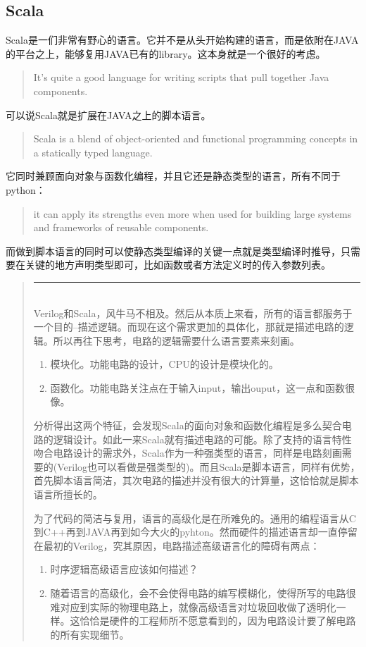 \documentclass[twocolumn,10pt]{article}
\newenvironment{commentary}
{ \vspace{-0.1in}
  \begin{quotation}
  \noindent
  \small \em
  \rule{\linewidth}{1pt}\\
}
{
  \end{quotation}
}
\begin{document}
\subsection{Scala}
Scala是一们非常有野心的语言。它并不是从头开始构建的语言，而是依附在JAVA的平台之上，能够复用JAVA已有的library。这本身就是一个很好的考虑。
\begin{quote}
	It’s quite a good language for writing scripts that pull together Java components.
\end{quote} 
可以说Scala就是扩展在JAVA之上的脚本语言。
\begin{quote}
	Scala is a blend of object-oriented and functional programming concepts in a statically typed language.
\end{quote}
它同时兼顾面向对象与函数化编程，并且它还是静态类型的语言，所有不同于python：
\begin{quote}
	it can apply its strengths even more when used for building large systems and frameworks of reusable components.
\end{quote}
而做到脚本语言的同时可以使静态类型编译的关键一点就是类型编译时推导，只需要在关键的地方声明类型即可，比如函数或者方法定义时的传入参数列表。
\begin{commentary}
	Verilog和Scala，风牛马不相及。然后从本质上来看，所有的语言都服务于一个目的--描述逻辑。而现在这个需求更加的具体化，那就是描述电路的逻辑。所以再往下思考，电路的逻辑需要什么语言要素来刻画。
	\begin{enumerate}
		\item 模块化。功能电路的设计，CPU的设计是模块化的。
		\item 函数化。功能电路关注点在于输入input，输出ouput，这一点和函数很像。
	\end{enumerate}
	分析得出这两个特征，会发现Scala的面向对象和函数化编程是多么契合电路的逻辑设计。如此一来Scala就有描述电路的可能。除了支持的语言特性吻合电路设计的需求外，Scala作为一种强类型的语言，同样是电路刻画需要的(Verilog也可以看做是强类型的)。而且Scala是脚本语言，同样有优势，首先脚本语言简洁，其次电路的描述并没有很大的计算量，这恰恰就是脚本语言所擅长的。
	
	为了代码的简洁与复用，语言的高级化是在所难免的。通用的编程语言从C到C++再到JAVA再到如今大火的pyhton。然而硬件的描述语言却一直停留在最初的Verilog，究其原因，电路描述高级语言化的障碍有两点：
	\begin{enumerate}
		\item 时序逻辑高级语言应该如何描述？
		\item 随着语言的高级化，会不会使得电路的编写模糊化，使得所写的电路很难对应到实际的物理电路上，就像高级语言对垃圾回收做了透明化一样。这恰恰是硬件的工程师所不愿意看到的，因为电路设计要了解电路的所有实现细节。
	\end{enumerate}
\end{commentary}
\end{document}
